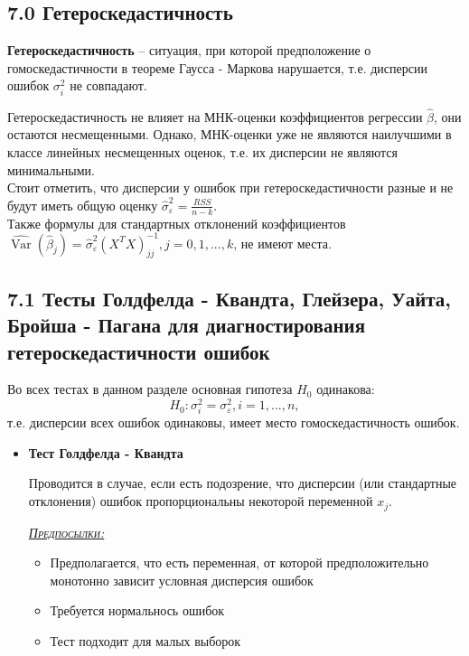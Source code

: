 \documentclass[a0,final]{a0poster}
\DeclareMathOperator{\Var}{Var}
\begin{document}
\begin{multicols}{4}
\section*{7.0 Гетероскедастичность}
\begin{tcolorbox}[colback=red!5!white,colframe=red!75!black]
\textbf{Гетероскедастичность} -- ситуация, при которой предположение о гомоскедастичности в теореме Гаусса - Маркова нарушается, т.е. дисперсии ошибок $\sigma^2_i$ не совпадают.
\end{tcolorbox}
Гетероскедастичность не влияет на МНК-оценки коэффициентов регрессии $\hat{\beta}$, они остаются несмещенными. Однако, МНК-оценки уже не являются наилучшими в классе линейных несмещенных оценок, т.е. их дисперсии не являются минимальными. \\
Стоит отметить, что дисперсии у ошибок при гетероскедастичности разные и не будут иметь общую оценку $\hat{\sigma}^2_\varepsilon = \frac{RSS}{n-k}$. \\
Также формулы для стандартных отклонений коэффициентов $\hat{\Var}(\hat{\beta}_j) = \hat{\sigma}^2_\varepsilon(X^TX)^{-1}_{jj}, j = 0, 1, ..., k$, не имеют места.
\subsection*{7.1 Тесты Голдфелда - Квандта, Глейзера, Уайта, Бройша - Пагана для диагностирования гетероскедастичности ошибок}
Во всех тестах в данном разделе основная гипотеза $H_0$ одинакова: $$H_0: \sigma^2_i = \sigma^2_\varepsilon,  i = 1, ..., n,$$ т.е. дисперсии всех ошибок одинаковы, имеет место гомоскедастичность ошибок.

\begin{itemize}
\item \textbf{Тест Голдфелда - Квандта}

Проводится в случае, если есть подозрение, что дисперсии (или стандартные отклонения) ошибок пропорциональны некоторой переменной $x_j$.

\underline{\textsc{\textit{Предпосылки:}}}
\begin{itemize}
\item Предполагается, что есть переменная, от которой предположительно монотонно зависит условная дисперсия ошибок
\item Требуется нормальнось ошибок
\item Тест подходит для малых выборок
\end{itemize}


\end{itemize}
\end{multicols}
\end{document}
